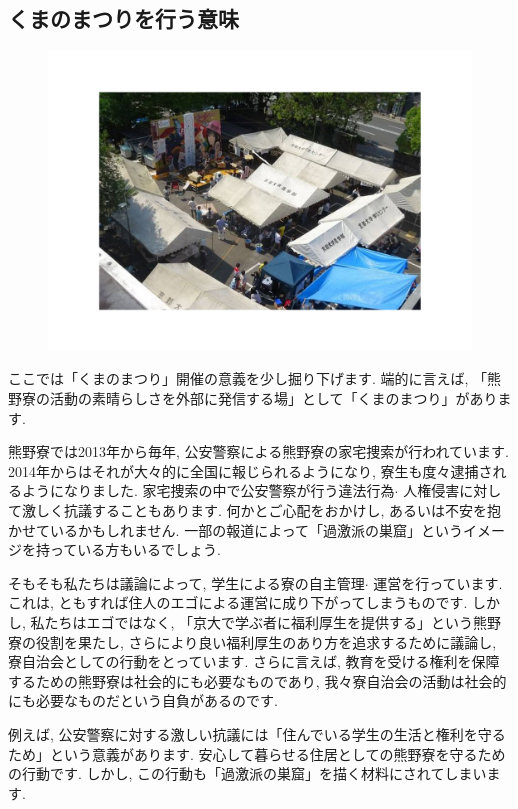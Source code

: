 \documentclass[10pt,b5jsbook,dvips,dvipdfmx,openany]{jsbook}
\theoremstyle{definition}
\begin{document}
		\subsection{くまのまつりを行う意味}

	\begin{figure}
		\includegraphics[scale=0.4]{kumano_fes.pdf}
			\label{fig:くまのまつり}
			\end{figure}
		ここでは「くまのまつり」開催の意義を少し掘り下げます. 端的に言えば, 「熊野寮の活動の素晴らしさを外部に発信する場」として「くまのまつり」があります.

		熊野寮では2013年から毎年, 公安警察による熊野寮の家宅捜索が行われています. 2014年からはそれが大々的に全国に報じられるようになり, 寮生も度々逮捕されるようになりました. 家宅捜索の中で公安警察が行う違法行為$ \cdot $ 人権侵害に対して激しく抗議することもあります. 何かとご心配をおかけし, あるいは不安を抱かせているかもしれません. 一部の報道によって「過激派の巣窟」というイメージを持っている方もいるでしょう.

		そもそも私たちは議論によって, 学生による寮の自主管理$ \cdot $ 運営を行っています. これは, ともすれば住人のエゴによる運営に成り下がってしまうものです. しかし, 私たちはエゴではなく, 「京大で学ぶ者に福利厚生を提供する」という熊野寮の役割を果たし, さらにより良い福利厚生のあり方を追求するために議論し, 寮自治会としての行動をとっています. さらに言えば, 教育を受ける権利を保障するための熊野寮は社会的にも必要なものであり, 我々寮自治会の活動は社会的にも必要なものだという自負があるのです.

		例えば, 公安警察に対する激しい抗議には「住んでいる学生の生活と権利を守るため」という意義があります. 安心して暮らせる住居としての熊野寮を守るための行動です. しかし, この行動も「過激派の巣窟」を描く材料にされてしまいます.
\end{document}
